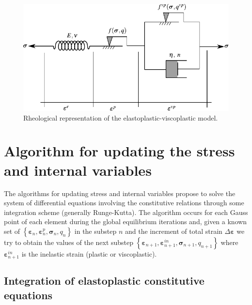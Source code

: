 \documentclass[Journal,letterpaper]{ascelike-new}
\newcommand{\strain}{\boldsymbol{\varepsilon}}
\newcommand{\stress}{\boldsymbol{\sigma}}
\begin{document}
\begin{figure}
	\centering
	\includegraphics[scale=1]{FIG1.pdf}
	\caption{Rheological representation of the elastoplastic-viscoplastic model.}
	\label{reological_scheme}
\end{figure}

\section{Algorithm for updating the stress and internal variables}

The algorithms for updating stress and internal variables propose to solve the system of differential equations involving the constitutive relations through some integration scheme (generally Runge-Kutta). The algorithm occurs for each Gauss point of each element during the global equilibrium iterations and, given a known set of $\left\{ \strain_n, \strain_n^p,\stress_n,q_n \right\}$ in the substep $n$ and the increment of total strain $\Delta \strain$ we try to obtain the values of the next substep $\left\{ \strain_{n+1}, \strain_{n+1}^{in},\stress_{n+1},q_{n+1} \right\}$ where $\strain_{n+1}^{in}$ is the inelastic strain (plastic or viscoplastic).

\subsection{Integration of elastoplastic constitutive equations}
\end{document}
